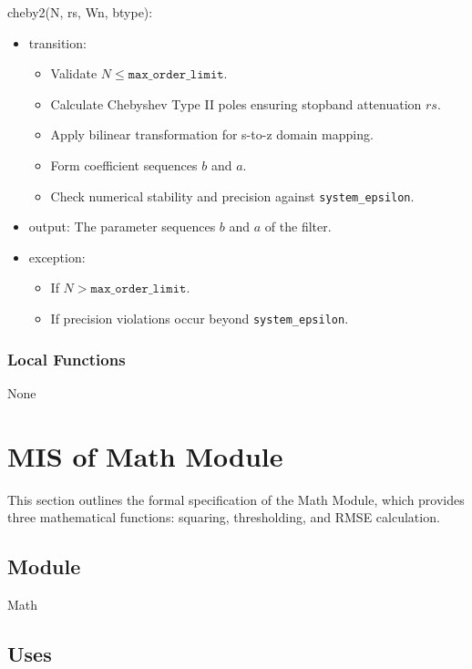 \documentclass[12pt, titlepage]{article}
\begin{document}
\noindent cheby2(N, rs, Wn, btype):
\begin{itemize}
\item transition:
    \begin{itemize}
    \item Validate $N \leq \texttt{max\_order\_limit}$.
    \item Calculate Chebyshev Type II poles ensuring stopband attenuation $rs$.
    \item Apply bilinear transformation for s-to-z domain mapping.
    \item Form coefficient sequences $b$ and $a$.
    \item Check numerical stability and precision against
    \texttt{system\_epsilon}.
    \end{itemize}
\item output: The parameter sequences $b$ and $a$ of the filter.
\item exception:
    \begin{itemize}
    \item If $N > \texttt{max\_order\_limit}$.
    \item If precision violations occur beyond \texttt{system\_epsilon}.
    \end{itemize}
\end{itemize}

\subsubsection{Local Functions}

None

\newpage

\section{MIS of Math Module} \label{MIS_Math}

This section outlines the formal specification of the Math Module, which
provides three mathematical functions: squaring, thresholding, and RMSE
calculation.

\subsection{Module}

Math

\subsection{Uses}
\end{document}
